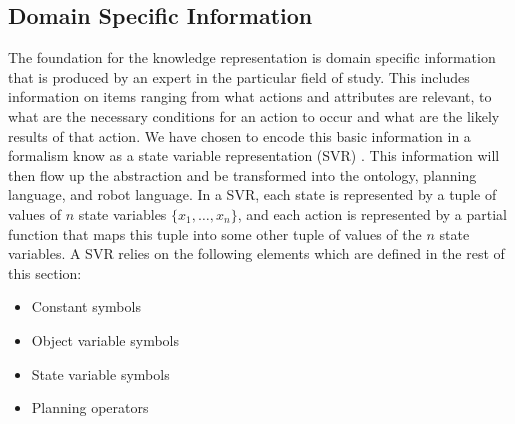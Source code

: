\documentclass[a4paper, 10pt, conference]{ieeeconf}      %
\begin{document}
\subsection{Domain Specific Information}
The foundation for the knowledge representation is domain specific information that is produced by an expert in the particular field of study. This includes
information on items ranging from what actions and attributes are relevant, to what are the necessary conditions for an action to occur and what are the
likely results of that action. We have chosen to encode this basic information in a formalism know as a state variable representation (SVR) \cite{NAU.2004}.
This information will then flow up the abstraction and be transformed into the ontology, planning language, and robot language.
In a SVR, each state is represented by a tuple of values of $n$ state variables $\lbrace x_1,\dots,x_n\rbrace$, and each action is represented by a partial function that maps this tuple into some other tuple of values of the $n$ state variables. A SVR relies on the following elements which are defined in the rest of this section:
\begin{itemize}
  \item Constant symbols
  \item Object variable symbols
  \item State variable symbols
  \item Planning operators
\end{itemize}
\end{document}
